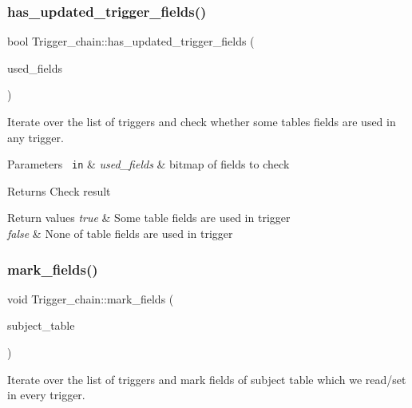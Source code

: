 \subsubsection{\texorpdfstring{has\+\_\+updated\+\_\+trigger\+\_\+fields()}{has\_updated\_trigger\_fields()}}
{\footnotesize\ttfamily bool Trigger\+\_\+chain\+::has\+\_\+updated\+\_\+trigger\+\_\+fields (\begin{DoxyParamCaption}\item[{const M\+Y\+\_\+\+B\+I\+T\+M\+AP $\ast$}]{used\+\_\+fields }\end{DoxyParamCaption})}

Iterate over the list of triggers and check whether some table\textquotesingle{}s fields are used in any trigger.


\begin{DoxyParams}[1]{Parameters}
\mbox{\texttt{ in}}  & {\em used\+\_\+fields} & bitmap of fields to check\\
\hline
\end{DoxyParams}
\begin{DoxyReturn}{Returns}
Check result 
\end{DoxyReturn}

\begin{DoxyRetVals}{Return values}
{\em true} & Some table fields are used in trigger \\
\hline
{\em false} & None of table fields are used in trigger \\
\hline
\end{DoxyRetVals}
\mbox{\label{classTrigger__chain_ad54d622b2bff22f44fbeda41a79dccb8}} 
\subsubsection{\texorpdfstring{mark\+\_\+fields()}{mark\_fields()}}
{\footnotesize\ttfamily void Trigger\+\_\+chain\+::mark\+\_\+fields (\begin{DoxyParamCaption}\item[{\mbox{\hyperlink{structTABLE}{T\+A\+B\+LE}} $\ast$}]{subject\+\_\+table }\end{DoxyParamCaption})}

Iterate over the list of triggers and mark fields of subject table which we read/set in every trigger.


